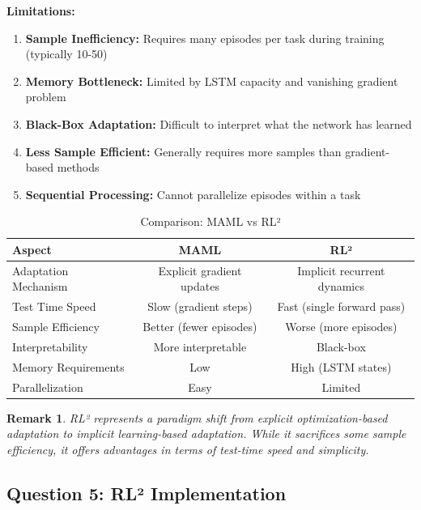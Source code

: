 \documentclass[12pt]{article}
\newcommand{\ieee}[1]{\textcolor{IEEEBlue}{\textbf{#1}}}
\newtheorem{remark}{Remark}
\begin{document}
{{			\ieee{Limitations:}
			
			\begin{enumerate}
				\item \textbf{Sample Inefficiency:} Requires many episodes per task during training (typically 10-50)
				\item \textbf{Memory Bottleneck:} Limited by LSTM capacity and vanishing gradient problem
				\item \textbf{Black-Box Adaptation:} Difficult to interpret what the network has learned
				\item \textbf{Less Sample Efficient:} Generally requires more samples than gradient-based methods
				\item \textbf{Sequential Processing:} Cannot parallelize episodes within a task
			\end{enumerate}
			
			\begin{table}[H]
			\centering
			\caption{Comparison: MAML vs RL²}
			\begin{tabular}{@{}lcc@{}}
			\toprule
			\textbf{Aspect} & \textbf{MAML} & \textbf{RL²} \\
			\midrule
			Adaptation Mechanism & Explicit gradient updates & Implicit recurrent dynamics \\
			Test Time Speed & Slow (gradient steps) & Fast (single forward pass) \\
			Sample Efficiency & Better (fewer episodes) & Worse (more episodes) \\
			Interpretability & More interpretable & Black-box \\
			Memory Requirements & Low & High (LSTM states) \\
			Parallelization & Easy & Limited \\
			\bottomrule
			\end{tabular}
			\label{tab:maml_vs_rl2}
			\end{table}
			
			\begin{remark}
			RL² represents a paradigm shift from explicit optimization-based adaptation to implicit learning-based adaptation. While it sacrifices some sample efficiency, it offers advantages in terms of test-time speed and simplicity.
			\end{remark}
			
			\subsection{Question 5: RL² Implementation}
			
}}
\end{document}
